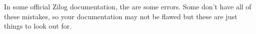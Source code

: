 \documentclass[12pt,twoside,openright,a4paper]{book}
\begin{document}

In some official Zilog documentation, the are some errors. Some don't have all of these mistakes, so your documentation may not be flawed but these are just things to look out for.
\end{document}
